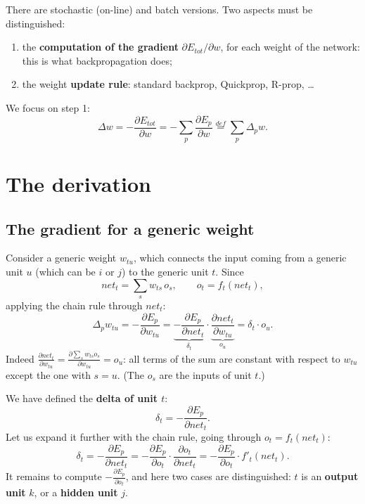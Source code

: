 There are stochastic (on-line) and batch versions. Two aspects must be
distinguished:

\begin{enumerate}
\def\labelenumi{\arabic{enumi}.}
\tightlist
\item
  the \textbf{computation of the gradient} \(\partial E_{tot}/\partial w\),
  for each weight of the network: this is what backpropagation does;
\item
  the weight \textbf{update rule}: standard backprop, Quickprop,
  R-prop, \ldots{}
\end{enumerate}

We focus on step 1: \[
\Delta w = -\frac{\partial E_{tot}}{\partial w} = -\sum_p \frac{\partial E_p}{\partial w} \overset{def}{=} \sum_p \Delta_p w.
\]

\section{The derivation}\label{la-derivazione}

\subsection{The gradient for a generic
weight}\label{il-gradiente-per-un-peso-generico}

Consider a generic weight \(w_{tu}\), which connects the input coming
from a generic unit \(u\) (which can be \(i\) or \(j\)) to the generic
unit \(t\). Since \[
net_t = \sum_s w_{ts}\,o_s, \qquad o_t = f_t(net_t),
\] applying the chain rule through \(net_t\): \[
\Delta_p w_{tu} = -\frac{\partial E_p}{\partial w_{tu}} = \underbrace{-\frac{\partial E_p}{\partial net_t}}_{\delta_t}\cdot\underbrace{\frac{\partial net_t}{\partial w_{tu}}}_{o_u} = \delta_t\cdot o_u.
\] Indeed
\(\frac{\partial net_t}{\partial w_{tu}} = \frac{\partial \sum_s w_{ts} o_s}{\partial w_{tu}} = o_u\):
all terms of the sum are constant with respect to \(w_{tu}\) except the
one with \(s = u\). (The \(o_s\) are the inputs of unit \(t\).)

We have defined the \textbf{delta of unit \(t\)}: \[
\delta_t = -\frac{\partial E_p}{\partial net_t}.
\] Let us expand it further with the chain rule, going through
\(o_t = f_t(net_t)\): \[
\delta_t = -\frac{\partial E_p}{\partial net_t} = -\frac{\partial E_p}{\partial o_t}\cdot\frac{\partial o_t}{\partial net_t} = -\frac{\partial E_p}{\partial o_t}\cdot f'_t(net_t).
\] It remains to compute \(-\frac{\partial E_p}{\partial o_t}\), and
here two cases are distinguished: \(t\) is an \textbf{output unit}
\(k\), or a \textbf{hidden unit} \(j\).


